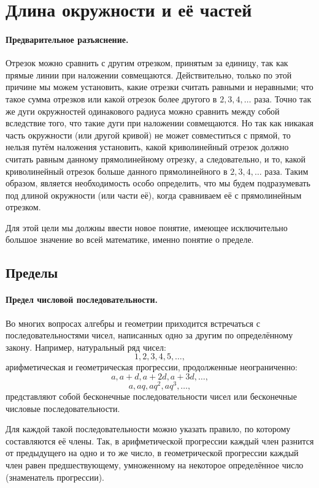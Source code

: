 \section{Длина окружности и её частей}

\paragraph{Предварительное разъяснение.}\label{1938/226}
Отрезок можно сравнить с другим отрезком, принятым за единицу, так как прямые линии при наложении совмещаются.
Действительно, только по этой причине мы можем установить, какие отрезки считать равными и неравными;
что такое сумма отрезков или какой отрезок более другого в $2, 3, 4,\dots$ раза.
Точно так же дуги окружностей одинакового радиуса можно сравнить между собой вследствие того, что такие дуги при наложении совмещаются.
Но так как никакая часть окружности (или другой кривой) не может совместиться с прямой, то нельзя путём наложения установить, какой криволинейный отрезок должно считать равным данному прямолинейному отрезку, а следовательно, и то, какой криволинейный отрезок больше данного прямолинейного в $2,3,4,\dots$
раза.
Таким образом, является необходимость особо определить, что мы будем подразумевать под длиной окружности (или части её), когда сравниваем её с прямолинейным отрезком.

Для этой цели мы должны ввести новое понятие, имеющее исключительно большое значение во всей математике, именно понятие о пределе.

\subsection*{Пределы}

\paragraph{Предел числовой последовательности.}\label{1938/227}
Во многих вопросах алгебры и геометрии приходится встречаться с последовательностями чисел, написанных одно за другим по определённому закону.
Например, натуральный ряд чисел:
\[1, 2, 3, 4, 5,\dots,\]
арифметическая и геометрическая прогрессии, продолженные неограниченно:
\[a,a+d,a+2d,a+3d,\dots,\]
\[a,aq,aq^2,aq^3,\dots,\]
представляют собой бесконечные последовательности чисел или бесконечные числовые последовательности.

Для каждой такой последовательности можно указать правило, по которому составляются её члены.
Так, в арифметической прогрессии каждый член разнится от предыдущего на одно и то же число, в геометрической прогрессии каждый член равен предшествующему, умноженному на некоторое определённое число (знаменатель прогрессии).

